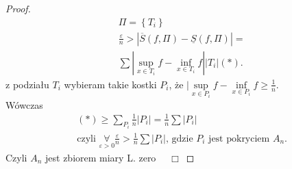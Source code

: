 \documentclass[../main.tex]{subfiles}
\begin{document}
\begin{proof}
        \begin{align*}
            &\Pi = \left\{ T_i \right\}\\
            &\frac{\varepsilon}{n} > |\overline{S}(f,\Pi) - \underline{S}(f,\Pi)| = \\
            &\sum | \underset{x\in T_i}{\sup} f - \underset{x\in T_i}{\inf} f| |T_i|
            (*)
        .\end{align*}
        z podziału $T_i$ wybieram takie kostki $P_i$, że $|\underset{x\in P_i}{\sup} f - \underset{x\in P_i}{\inf} f \ge \frac{1}{n}$.\\
        Wówczas
        \begin{align*}
            &(*) \ge \sum_{P_i} \frac{1}{n} | P_i | = \frac{1}{n} \sum |P_i|\\
            &\text{czyli } \underset{\varepsilon>0}{\forall} \frac{\varepsilon}{n} > \frac{1}{n} \sum |P_i|\text{, gdzie $P_i$ jest pokryciem $A_n$}
        .\end{align*}
        Czyli $A_n$ jest zbiorem miary L. zero $\quad\Box$
    \end{proof}
\end{document}

